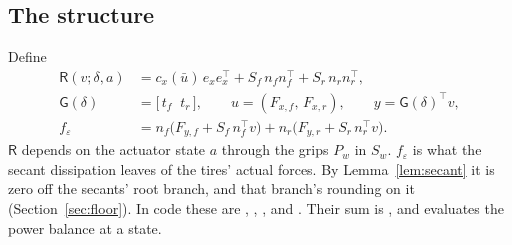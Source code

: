 \documentclass[11pt]{article}
\theoremstyle{remark}
\newcommand{\R}{\mathsf R}
\newcommand{\G}{\mathsf G}
\newcommand{\ub}{\bar u}
\newcommand{\T}{^{\top}}
\begin{document}
\subsection{The structure}
Define
\begin{align}
  \R(v;\delta,a)&=c_x(\ub)\,e_xe_x\T+S_f\,n_fn_f\T+S_r\,n_rn_r\T,
  \label{eq:R}\\
  \G(\delta)&=\big[\,t_f\;\;t_r\,\big],\qquad u=(F_{x,f},\,F_{x,r}),\qquad y=\G(\delta)\T v,
  \label{eq:G}\\
  f_\varepsilon&=n_f\big(F_{y,f}+S_f\,n_f\T v\big)+n_r\big(F_{y,r}+S_r\,n_r\T v\big).
  \label{eq:feps}
\end{align}
$\R$ depends on the actuator state $a$ through the grips $P_w$ in $S_w$. $f_\varepsilon$ is what the
secant dissipation leaves of the tires' actual forces. By Lemma~\ref{lem:secant} it is zero off
the secants' root branch, and that branch's rounding on it (Section~\ref{sec:floor}). In code
these are ,
, ,  and . Their sum is
, and  evaluates the power balance at a state.
\end{document}
